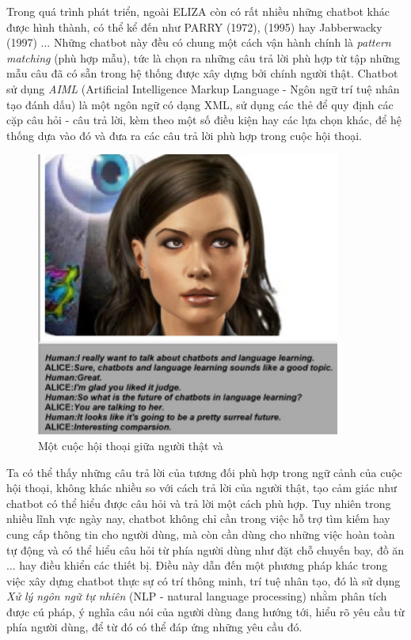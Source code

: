 \documentclass[12pt]{report}
\begin{document}
Trong quá trình phát triển, ngoài ELIZA còn có rất nhiều những chatbot khác được hình thành, có thể kể đến như PARRY (1972), \alice (1995) hay Jabberwacky (1997) ... Những chatbot này đều có chung một cách vận hành chính là \textit{pattern matching} (phù hợp mẫu), tức là chọn ra những câu trả lời phù hợp từ tập những mẫu câu đã có sẵn trong hệ thống được xây dựng bởi chính người thật. Chatbot \alice sử dụng \textit{AIML} (Artificial Intelligence Markup Language - Ngôn ngữ trí tuệ nhân tạo đánh dấu) là một ngôn ngữ có dạng XML, sử dụng các thẻ để quy định các cặp câu hỏi - câu trả lời, kèm theo một số điều kiện hay các lựa chọn khác, để hệ thống dựa vào đó và đưa ra các câu trả lời phù hợp trong cuộc hội thoại.

\begin{figure}[H]
  \centering
    \includegraphics[width=10cm]{Pics/Chap1/alice.jpg}
  \caption{Một cuộc hội thoại giữa người thật và \alice}
\end{figure}

Ta có thể thấy những câu trả lời của \alice tương đối phù hợp trong ngữ cảnh của cuộc hội thoại, không khác nhiều so với cách trả lời của người thật, tạo cảm giác như chatbot có thể hiểu được câu hỏi và trả lời một cách phù hợp. Tuy nhiên trong nhiều lĩnh vực ngày nay, chatbot không chỉ cần trong việc hỗ trợ tìm kiếm hay cung cấp thông tin cho người dùng, mà còn cần dùng cho những việc hoàn toàn tự động và có thể hiểu câu hỏi từ phía người dùng như đặt chỗ chuyến bay, đồ ăn ... hay điều khiển các thiết bị. Điều này dẫn đến một phương pháp khác trong việc xây dựng chatbot thực sự có trí thông minh, trí tuệ nhân tạo, đó là sử dụng \textit{Xử lý ngôn ngữ tự nhiên} (NLP - natural language processing) nhằm phân tích được cú pháp, ý nghĩa câu nói của người dùng đang hướng tới, hiểu rõ yêu cầu từ phía người dùng, để từ đó có thể đáp ứng những yêu cầu đó.
\end{document}
